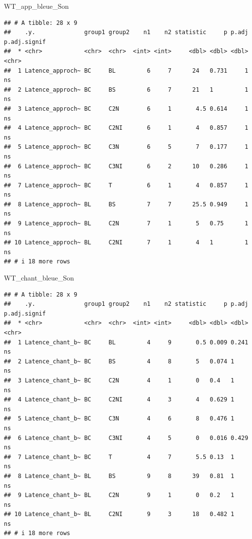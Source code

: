 \documentclass[
  french,
]{article}
\newenvironment{Shaded}{\begin{snugshade}}{\end{snugshade}}
\newcommand{\NormalTok}[1]{#1}
\begin{document}
\begin{Shaded}
\begin{Highlighting}[]
\NormalTok{WT\_app\_bleue\_Son}
\end{Highlighting}
\end{Shaded}

\begin{verbatim}
## # A tibble: 28 x 9
##    .y.              group1 group2    n1    n2 statistic     p p.adj p.adj.signif
##  * <chr>            <chr>  <chr>  <int> <int>     <dbl> <dbl> <dbl> <chr>       
##  1 Latence_approch~ BC     BL         6     7      24   0.731     1 ns          
##  2 Latence_approch~ BC     BS         6     7      21   1         1 ns          
##  3 Latence_approch~ BC     C2N        6     1       4.5 0.614     1 ns          
##  4 Latence_approch~ BC     C2NI       6     1       4   0.857     1 ns          
##  5 Latence_approch~ BC     C3N        6     5       7   0.177     1 ns          
##  6 Latence_approch~ BC     C3NI       6     2      10   0.286     1 ns          
##  7 Latence_approch~ BC     T          6     1       4   0.857     1 ns          
##  8 Latence_approch~ BL     BS         7     7      25.5 0.949     1 ns          
##  9 Latence_approch~ BL     C2N        7     1       5   0.75      1 ns          
## 10 Latence_approch~ BL     C2NI       7     1       4   1         1 ns          
## # i 18 more rows
\end{verbatim}

\begin{Shaded}
\begin{Highlighting}[]
\NormalTok{WT\_chant\_bleue\_Son}
\end{Highlighting}
\end{Shaded}

\begin{verbatim}
## # A tibble: 28 x 9
##    .y.              group1 group2    n1    n2 statistic     p p.adj p.adj.signif
##  * <chr>            <chr>  <chr>  <int> <int>     <dbl> <dbl> <dbl> <chr>       
##  1 Latence_chant_b~ BC     BL         4     9       0.5 0.009 0.241 ns          
##  2 Latence_chant_b~ BC     BS         4     8       5   0.074 1     ns          
##  3 Latence_chant_b~ BC     C2N        4     1       0   0.4   1     ns          
##  4 Latence_chant_b~ BC     C2NI       4     3       4   0.629 1     ns          
##  5 Latence_chant_b~ BC     C3N        4     6       8   0.476 1     ns          
##  6 Latence_chant_b~ BC     C3NI       4     5       0   0.016 0.429 ns          
##  7 Latence_chant_b~ BC     T          4     7       5.5 0.13  1     ns          
##  8 Latence_chant_b~ BL     BS         9     8      39   0.81  1     ns          
##  9 Latence_chant_b~ BL     C2N        9     1       0   0.2   1     ns          
## 10 Latence_chant_b~ BL     C2NI       9     3      18   0.482 1     ns          
## # i 18 more rows
\end{verbatim}
\end{document}
